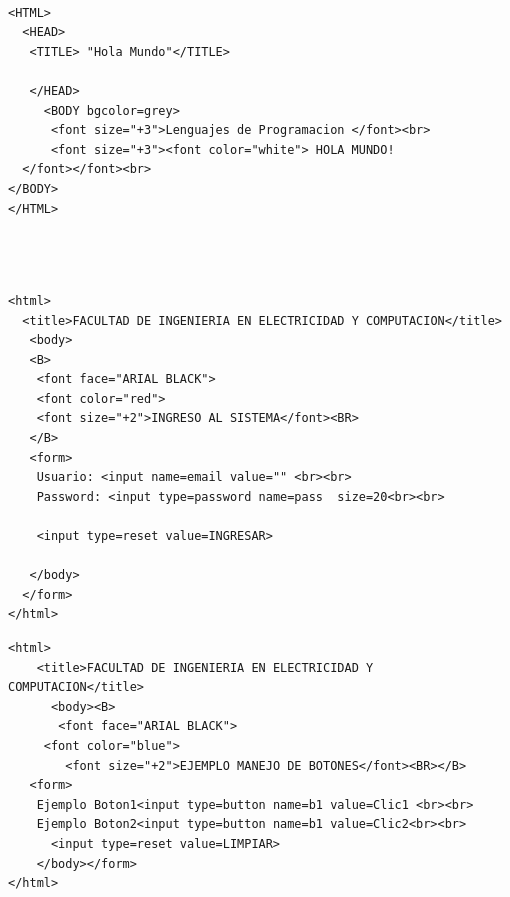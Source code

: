 \documentclass[11pt]{article} %
\begin{document}
\begin{center}

\end{center}

\begin{lstlisting}[frame=single]  % Start your code-block

<HTML>
  <HEAD>
   <TITLE> "Hola Mundo"</TITLE>

   </HEAD>
     <BODY bgcolor=grey>
      <font size="+3">Lenguajes de Programacion </font><br>
      <font size="+3"><font color="white"> HOLA MUNDO!
  </font></font><br>
</BODY>
</HTML>



\end{lstlisting}


\begin{lstlisting}[frame=single]  % Start your code-block

<html>
  <title>FACULTAD DE INGENIERIA EN ELECTRICIDAD Y COMPUTACION</title>
   <body>
   <B>
    <font face="ARIAL BLACK">
    <font color="red">
    <font size="+2">INGRESO AL SISTEMA</font><BR>
   </B>
   <form>
    Usuario: <input name=email value="" <br><br>
    Password: <input type=password name=pass  size=20<br><br>

    <input type=reset value=INGRESAR>

   </body>
  </form>
</html>

\end{lstlisting}

\begin{lstlisting}[frame=single]  % Start your code-block
<html>
    <title>FACULTAD DE INGENIERIA EN ELECTRICIDAD Y COMPUTACION</title>
      <body><B>
       <font face="ARIAL BLACK">
     <font color="blue">
        <font size="+2">EJEMPLO MANEJO DE BOTONES</font><BR></B>
   <form>
    Ejemplo Boton1<input type=button name=b1 value=Clic1 <br><br>
    Ejemplo Boton2<input type=button name=b1 value=Clic2<br><br>
      <input type=reset value=LIMPIAR>
    </body></form>
</html>
\end{lstlisting}
\end{document}
